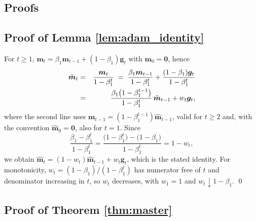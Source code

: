 \documentclass[a4paper,fleqn]{cas-sc}
\theoremstyle{plain}
\theoremstyle{definition}
\theoremstyle{remark}
\begin{document}

\begin{appendices}

\section{Proofs}
\label{sec:proofs}

\subsection*{Proof of Lemma \ref{lem:adam_identity}}

For $t\ge1$, $\bm m_t=\beta_1\bm m_{t-1}+(1-\beta_1)\bm g_t$ with $\bm m_0=\bm 0$, hence
\begin{eqnarray}
\hat{\bm m}_t
&=&
\frac{\bm m_t}{1-\beta_1^{t}}
\;=\;
\frac{\beta_1\bm m_{t-1}}{1-\beta_1^{t}}
+\frac{(1-\beta_1)\bm g_t}{1-\beta_1^{t}}
\cr
&=&
\frac{\beta_1\bigl(1-\beta_1^{t-1}\bigr)}{1-\beta_1^{t}}\,\hat{\bm m}_{t-1}
+w_t\bm g_t ,
\end{eqnarray}
where the second line uses $\bm m_{t-1}=(1-\beta_1^{t-1})\hat{\bm m}_{t-1}$, valid for $t\ge2$ and, with the convention $\hat{\bm m}_0=\bm 0$, also for $t=1$. Since
\begin{equation}
\frac{\beta_1-\beta_1^{t}}{1-\beta_1^{t}}
=
\frac{\bigl(1-\beta_1^{t}\bigr)-\bigl(1-\beta_1\bigr)}{1-\beta_1^{t}}
=
1-w_t ,
\end{equation}
we obtain $\hat{\bm m}_t=(1-w_t)\hat{\bm m}_{t-1}+w_t\bm g_t$, which is the stated identity. For monotonicity, $w_t=(1-\beta_1)/(1-\beta_1^t)$ has numerator free of $t$ and denominator increasing in $t$, so $w_t$ decreases, with $w_1=1$ and $w_t\downarrow1-\beta_1$. \qed

\subsection*{Proof of Theorem \ref{thm:master}}


\end{appendices}
\end{document}
